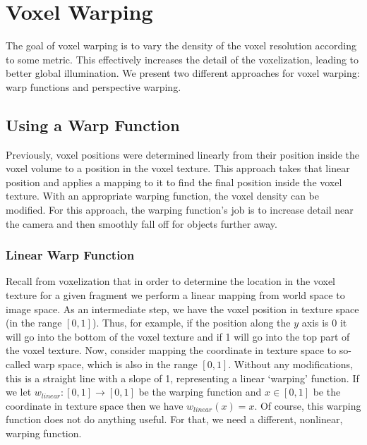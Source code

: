 \section{Voxel Warping}
The goal of voxel warping is to vary the density of the voxel resolution according to some metric. This effectively increases the detail of the voxelization, leading to better global illumination. We present two different approaches for voxel warping: warp functions and perspective warping.

\subsection{Using a Warp Function}
Previously, voxel positions were determined linearly from their position inside the voxel volume to a position in the voxel texture. This approach takes that linear position and applies a mapping to it to find the final position inside the voxel texture. With an appropriate warping function, the voxel density can be modified. For this approach, the warping function's job is to increase detail near the camera and then smoothly fall off for objects further away.

\subsubsection{Linear Warp Function}
Recall from voxelization that in order to determine the location in the voxel texture for a given fragment we perform a linear mapping from world space to image space. As an intermediate step, we have the voxel position in texture space (in the range $[0, 1]$). Thus, for example, if the position along the $y$ axis is 0 it will go into the bottom of the voxel texture and if 1 will go into the top part of the voxel texture. Now, consider mapping the coordinate in texture space to so-called warp space, which is also in the range $[0, 1]$. Without any modifications, this is a straight line with a slope of 1, representing a linear `warping' function. If we let $w_{linear}: [0, 1] \rightarrow [0, 1]$ be the warping function and $x \in [0, 1]$ be the coordinate in texture space then we have $w_{linear}(x) = x$. Of course, this warping function does not do anything useful. For that, we need a different, nonlinear, warping function.

